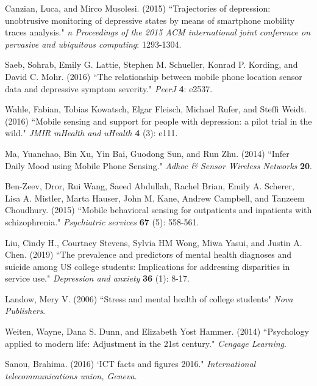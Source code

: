 \documentclass[3p,times,procedia]{elsarticle}
\begin{document}
\begin{thebibliography}{}
Canzian, Luca, and Mirco Musolesi. (2015) ``Trajectories of depression: unobtrusive monitoring of depressive states by means of smartphone mobility traces analysis." {\it n Proceedings of the 2015 ACM international joint conference on pervasive and ubiquitous computing}: 1293-1304.

Saeb, Sohrab, Emily G. Lattie, Stephen M. Schueller, Konrad P. Kording, and David C. Mohr. (2016) ``The relationship between mobile phone location sensor data and depressive symptom severity." {\it PeerJ} {\bf 4}: e2537.

Wahle, Fabian, Tobias Kowatsch, Elgar Fleisch, Michael Rufer, and Steffi Weidt. (2016) ``Mobile sensing and support for people with depression: a pilot trial in the wild." {\it JMIR mHealth and uHealth} {\bf 4} (3): e111.

Ma, Yuanchao, Bin Xu, Yin Bai, Guodong Sun, and Run Zhu. (2014) ``Infer Daily Mood using Mobile Phone Sensing." {\it Adhoc & Sensor Wireless Networks} {\bf 20}.

Ben-Zeev, Dror, Rui Wang, Saeed Abdullah, Rachel Brian, Emily A. Scherer, Lisa A. Mistler, Marta Hauser, John M. Kane, Andrew Campbell, and Tanzeem Choudhury. (2015) ``Mobile behavioral sensing for outpatients and inpatients with schizophrenia." {\it Psychiatric services} {\bf 67} (5): 558-561.

Liu, Cindy H., Courtney Stevens, Sylvia HM Wong, Miwa Yasui, and Justin A. Chen. (2019) ``The prevalence and predictors of mental health diagnoses and suicide among US college students: Implications for addressing disparities in service use." {\it Depression and anxiety} {\bf 36} (1): 8-17.

Landow, Mery V. (2006) ``Stress and mental health of college students" {\it Nova Publishers}.

Weiten, Wayne, Dana S. Dunn, and Elizabeth Yost Hammer. (2014) ``Psychology applied to modern life: Adjustment in the 21st century." {\it Cengage Learning}.

Sanou, Brahima. (2016) `ICT facts and figures 2016." {\it International telecommunications union, Geneva}.

\end{thebibliography}
\end{document}
